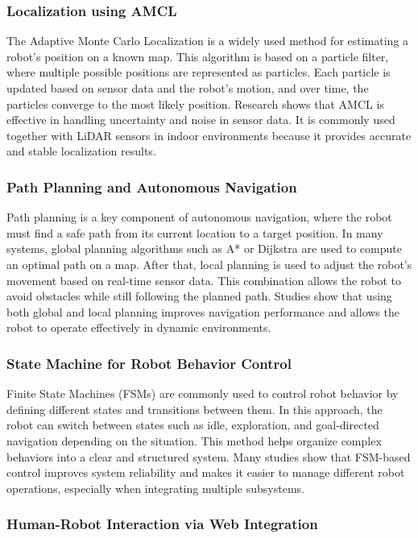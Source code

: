 \subsubsection{Localization using AMCL}

The Adaptive Monte Carlo Localization is a widely used method for estimating a robot’s position on a known map. This algorithm is based on a particle filter, where multiple possible positions are represented as particles. Each particle is updated based on sensor data and the robot’s motion, and over time, the particles converge to the most likely position. Research shows that AMCL is effective in handling uncertainty and noise in sensor data. It is commonly used together with LiDAR sensors in indoor environments because it provides accurate and stable localization results.

\subsubsection{Path Planning and Autonomous Navigation}

Path planning is a key component of autonomous navigation, where the robot must find a safe path from its current location to a target position. In many systems, global planning algorithms such as A* or Dijkstra are used to compute an optimal path on a map. After that, local planning is used to adjust the robot’s movement based on real-time sensor data. This combination allows the robot to avoid obstacles while still following the planned path. Studies show that using both global and local planning improves navigation performance and allows the robot to operate effectively in dynamic environments.

\subsubsection{State Machine for Robot Behavior Control}

Finite State Machines (FSMs) are commonly used to control robot behavior by defining different states and transitions between them. In this approach, the robot can switch between states such as idle, exploration, and goal-directed navigation depending on the situation. This method helps organize complex behaviors into a clear and structured system. Many studies show that FSM-based control improves system reliability and makes it easier to manage different robot operations, especially when integrating multiple subsystems.

\subsubsection{Human-Robot Interaction via Web Integration}


